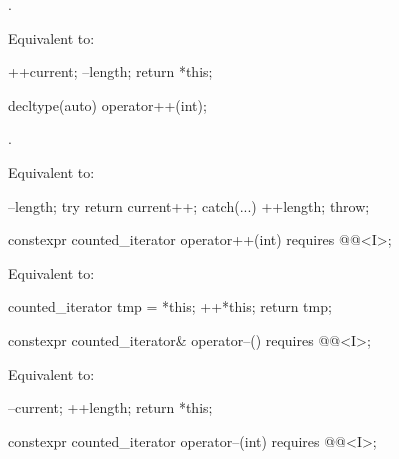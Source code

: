 \begin{itemdescr}
\pnum
\expects
{}.

\pnum
\effects
Equivalent to:
\begin{codeblock}
++current;
--length;
return *this;
\end{codeblock}
\end{itemdescr}

%
\begin{itemdecl}
decltype(auto) operator++(int);
\end{itemdecl}

\begin{itemdescr}
\pnum
\expects
{}.

\pnum
\effects
Equivalent to:
\begin{codeblock}
--length;
try { return current++; }
catch(...) { ++length; throw; }
\end{codeblock}
\end{itemdescr}

%
\begin{itemdecl}
constexpr counted_iterator operator++(int)
  requires @@<I>;
\end{itemdecl}

\begin{itemdescr}
\pnum
\effects
Equivalent to:
\begin{codeblock}
counted_iterator tmp = *this;
++*this;
return tmp;
\end{codeblock}
\end{itemdescr}

%
\begin{itemdecl}
  constexpr counted_iterator& operator--()
    requires @@<I>;
\end{itemdecl}

\begin{itemdescr}
\pnum
\effects
Equivalent to:
\begin{codeblock}
--current;
++length;
return *this;
\end{codeblock}
\end{itemdescr}

%
\begin{itemdecl}
  constexpr counted_iterator operator--(int)
    requires @@<I>;
\end{itemdecl}

